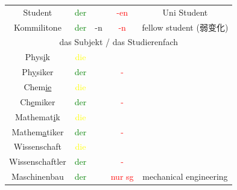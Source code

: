 \begin{center}
\begin{longtable} {|c|c|c|c|c|}
        Student                         & \textcolor{green}{der}                         &                       & \textcolor{red}{-en}                     & Uni Student             \\
        Kommilitone                     & \textcolor{green}{der}                         & -n                    & \textcolor{red}{-n}                      & fellow student (弱变化)    \\
        \hline
        \multicolumn{5}{|c|}{das Subjekt / das Studierenfach}                                                                                                                         \\
        \hline
        Phys\underline{i}k              & \textcolor{yellow}{die}                        &                       &                                          &                         \\
        Ph\underline{y}siker            & \textcolor{green}{der}                         &                       & \textcolor{red}{-}                       &                         \\
        \hline
        Chem\underline{ie}              & \textcolor{yellow}{die}                        &                       &                                          &                         \\
        Ch\underline{e}miker            & \textcolor{green}{der}                         &                       & \textcolor{red}{-}                       &                         \\
        \hline
        Mathemat\underline{i}k          & \textcolor{yellow}{die}                        &                       &                                          &                         \\
        Mathem\underline{a}tiker        & \textcolor{green}{der}                         &                       & \textcolor{red}{-}                       &                         \\
        \hline
        Wissenschaft                    & \textcolor{yellow}{die}                        &                       &                                          &                         \\
        Wissenschaftler                 & \textcolor{green}{der}                         &                       & \textcolor{red}{-}                       &                         \\
        \hline
        Maschinenbau                    & \textcolor{green}{der}                         &                       & \textcolor{red}{nur sg}                  & mechanical engineering  \\

\end{longtable}
\end{center}
